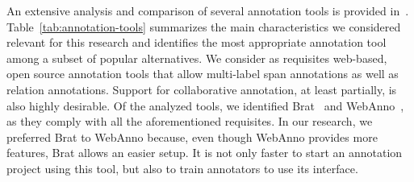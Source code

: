   An extensive analysis and comparison of several annotation tools is provided in~\citet{annotation-tools}.
  Table~\ref{tab:annotation-tools} summarizes the main characteristics we considered relevant for this research and identifies the most appropriate annotation tool among  a subset of  popular alternatives.
  We consider as requisites web-based, open source annotation tools that allow multi-label span annotations as well as relation annotations. Support for collaborative annotation, at least partially, is also highly desirable.
  Of the analyzed tools, we identified Brat~\cite{brat} and WebAnno~\cite{webanno}, as they comply with all the aforementioned requisites. In our research, we preferred Brat to WebAnno because, even though WebAnno provides more features, Brat allows an easier setup. It is not only faster to start an annotation project using this tool, but also to train annotators to use its interface.

